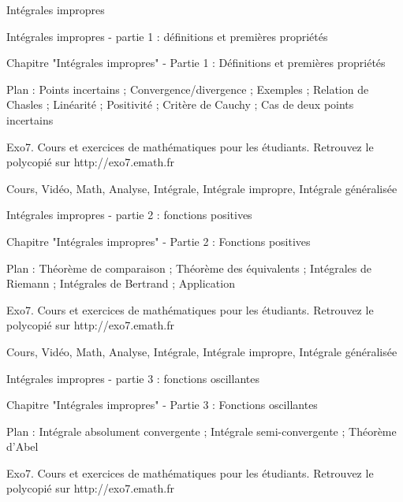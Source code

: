 
   Intégrales impropres




Intégrales impropres - partie 1 : définitions et premières propriétés



Chapitre "Intégrales impropres" - Partie 1 : Définitions et premières propriétés

Plan : Points incertains ; Convergence/divergence ; Exemples ; Relation de Chasles ;
Linéarité ; Positivité ; Critère de Cauchy ; Cas de deux points incertains

Exo7. Cours et exercices de mathématiques pour les étudiants.
Retrouvez le polycopié sur http://exo7.emath.fr


Cours, Vidéo, Math, Analyse, Intégrale, Intégrale impropre, Intégrale généralisée




Intégrales impropres - partie 2 : fonctions positives



Chapitre "Intégrales impropres" - Partie 2 : Fonctions positives

Plan : Théorème de comparaison ; Théorème des équivalents ;
Intégrales de Riemann ; Intégrales de Bertrand ; Application

Exo7. Cours et exercices de mathématiques pour les étudiants.
Retrouvez le polycopié sur http://exo7.emath.fr


Cours, Vidéo, Math, Analyse, Intégrale, Intégrale impropre, Intégrale généralisée



Intégrales impropres - partie 3 : fonctions oscillantes



Chapitre "Intégrales impropres" - Partie 3 : Fonctions oscillantes

Plan : Intégrale absolument convergente ; Intégrale semi-convergente ;
Théorème d'Abel

Exo7. Cours et exercices de mathématiques pour les étudiants.
Retrouvez le polycopié sur http://exo7.emath.fr

